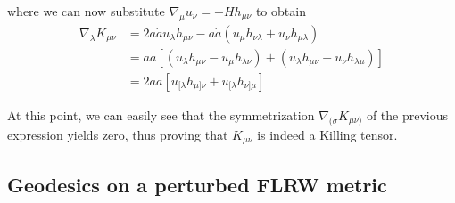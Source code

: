 where we can now substitute $\nabla_{\mu}u_{\nu} = -Hh_{\mu\nu}$ to obtain
\begin{align*}
    \nabla_{\lambda}K_{\mu\nu} &= 2a\dot{a}u_{\lambda}h_{\mu\nu} -a\dot{a}(u_{\mu}h_{\nu\lambda}+u_{\nu}h_{\mu\lambda})\\
    &= a\dot{a}\left[(u_{\lambda}h_{\mu\nu}-u_{\mu}h_{\lambda\nu})+(u_{\lambda}h_{\mu\nu}-u_{\nu}h_{\lambda\mu})\right]\\
    &= 2a\dot{a}\left[u_{[\lambda}h_{\mu]\nu} +u_{[\lambda}h_{\nu]\mu} \right]
\end{align*}
\par At this point, we can easily see that the symmetrization $\nabla_{(\sigma}K_{\mu\nu)}$ of the previous expression yields zero, thus proving that $K_{\mu\nu}$ is indeed a Killing tensor.

\subsection*{Geodesics on a perturbed FLRW metric}

